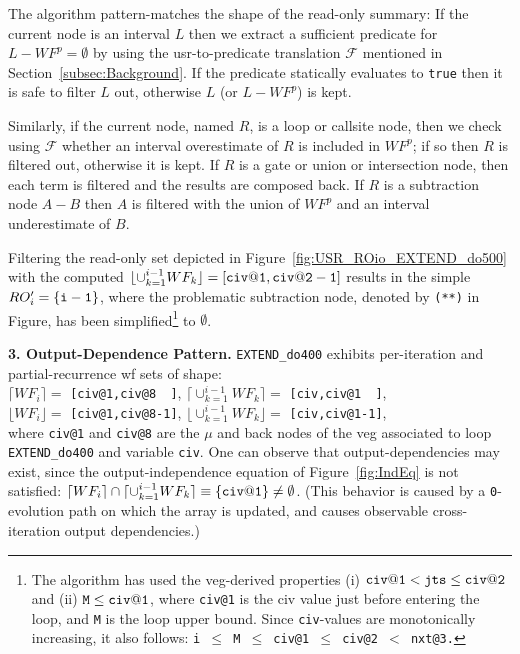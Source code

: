 \documentclass{sig-alternate}
\begin{document}
The algorithm pattern-matches the shape of the read-only summary:
If the current node is an interval $L$ then we extract a %
sufficient predicate for $L - WF^p = \emptyset$ by using the {\sc usr}-to-predicate
translation $\mathcal{F}$ mentioned in Section~\ref{subsec:Background}.   
If the predicate statically evaluates to {\tt true} then it is safe to 
filter $L$ out, otherwise $L$ (or $L-WF^p$) is kept.  

Similarly, if the current node, named $R$, is a loop or callsite node, 
then we check using $\mathcal{F}$ whether an interval overestimate of 
$R$ is included in $WF^p$; if so then $R$ is filtered out, otherwise 
it is kept.  
%
If $R$ is a gate or union or intersection node,
then each term is filtered and the results are composed back. 
%
If $R$ is a subtraction node $A-B$ then $A$ is filtered with the union 
of $WF^p$ and an interval underestimate of $B$. 

Filtering the read-only set depicted in Figure~\ref{fig:USR_ROio_EXTEND_do500}
with the computed $\lfloor \cup_{k=1}^{i-1}WF_k\rfloor={\tt [civ@1,civ@2-1]}$
results in the simple $RO'_{i} = {\tt\{i-1\}}$, where the problematic 
subtraction node, denoted by {\tt (**)} in Figure, has been simplified\footnote{
The algorithm has used the {\sc veg}-derived properties (i) ${\tt civ@1} < {\tt jts} \leq {\tt civ@2}$ 
and (ii) ${\tt M} \leq {\tt civ@1}$, where {\tt civ@1} is the {\sc civ} value 
just before entering the loop, and {\tt M} is the loop upper bound. Since 
{\tt civ}-values are monotonically increasing, it also follows: 
{\tt i $\leq$ M $\leq$ civ@1 $\leq$ civ@2 $<$ nxt@3.}
}
to $\emptyset$.%


\vspace{1ex}

{\bf 3. Output-Dependence Pattern.} 
%
{\tt EXTEND\_do400} exhibits per-iteration and partial-recurrence {\sc wf} 
sets of shape:\\
\noindent$\lceil WF_i\rceil = $ {\tt[civ@1,civ@8~~]},
$\lceil\cup_{k=1}^{i-1}WF_{k} \rceil = $ {\tt[civ,civ@1~~]},\\
\noindent$\lfloor WF_i\rfloor = $ {\tt[civ@1,civ@8-1]},
$\lfloor\cup_{k=1}^{i-1}WF_k \rfloor = $ {\tt[civ,civ@1-1]},\\
where {\tt civ@1} and {\tt civ@8} are the $\mu$ and back nodes of
the {\sc veg} associated to loop {\tt EXTEND\_do400} and variable {\tt civ}.
%
One can observe that output-dependencies may exist, since
the output-independence equation of Figure~\ref{fig:IndEq} is not satisfied:
$\lceil WF_{i}\rceil \cap \lceil \cup_{k=1}^{i-1}WF_{k} \rceil \equiv {\tt\{civ@1\}}\ne\emptyset$.
(This behavior is caused by a {\tt 0}-evolution path on which the array is updated,
and causes observable cross-iteration output dependencies.)
\end{document}
